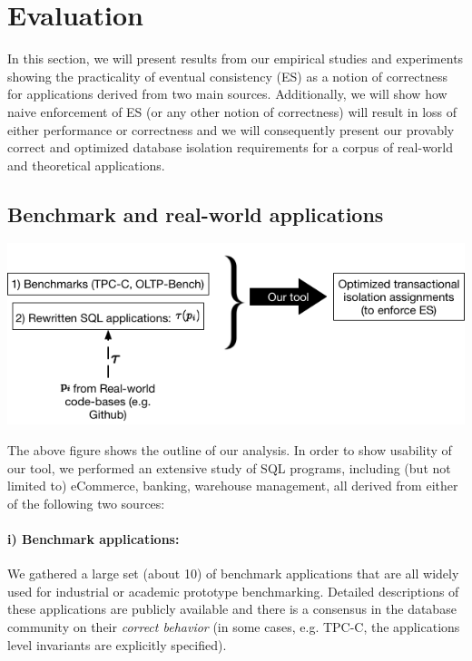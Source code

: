 \documentclass[12pt,letter]{article}
\begin{document}

\section{Evaluation}
In this section, we will present results from our empirical studies and
experiments showing the practicality of eventual consistency (ES) as a
notion of
correctness for  applications
derived from two main sources. Additionally, we will show how naive
enforcement
of ES (or any other notion of correctness) will result in loss of either
performance or correctness and we will
consequently present our provably correct and optimized 
database isolation requirements for a corpus of real-world and theoretical
applications.


\subsection{Benchmark and real-world applications}
\begin{center}
\includegraphics[scale=0.45]{figures/outline.png}
\end{center}
The above figure shows the outline of our analysis. In order to show usability
of our tool, we performed an extensive study of SQL programs, including (but not
limited to) eCommerce, banking, warehouse management, all derived from either of
the following two sources: 
\paragraph{i) Benchmark applications:} 
We gathered a large set (about 10) of benchmark applications that are all
widely used for
industrial or academic prototype benchmarking. Detailed descriptions of
these
applications are publicly available and there is a consensus in the
database
community on their \emph{correct behavior} (in some cases, e.g. TPC-C, the
applications
level invariants are explicitly specified).
\end{document}
